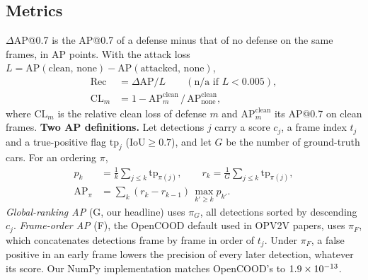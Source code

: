 \documentclass[conference]{IEEEtran}
\begin{document}
\subsection{Metrics}
$\Delta$AP@0.7 is the AP@0.7 of a defense minus that of no defense on the same frames, in AP points. With the
attack loss $L=\mathrm{AP}(\text{clean, none})-\mathrm{AP}(\text{attacked, none})$,
\begin{equation}
\begin{split}
\mathrm{Rec}&=\Delta\mathrm{AP}/L\qquad(\text{n/a if }L<0.005),\\
\mathrm{CL}_m&=1-\mathrm{AP}^{\mathrm{clean}}_{m}\,/\,\mathrm{AP}^{\mathrm{clean}}_{\mathrm{none}},
\end{split}
\label{eq:rec}
\end{equation}
where $\mathrm{CL}_m$ is the relative clean loss of defense $m$ and $\mathrm{AP}^{\mathrm{clean}}_{m}$ its AP@0.7
on clean frames.
\textbf{Two AP definitions.} Let detections $j$ carry a score $c_j$, a frame index $t_j$ and a true-positive
flag $\mathrm{tp}_j$ (IoU${}\ge 0.7$), and let $G$ be the number of ground-truth cars. For an ordering $\pi$,
\begin{equation}
\begin{split}
p_k&=\tfrac{1}{k}\textstyle\sum_{j\le k}\mathrm{tp}_{\pi(j)},\qquad
r_k=\tfrac{1}{G}\textstyle\sum_{j\le k}\mathrm{tp}_{\pi(j)},\\
\mathrm{AP}_\pi&=\textstyle\sum_k (r_k-r_{k-1})\,\max_{k'\ge k}p_{k'}.
\end{split}
\label{eq:ap}
\end{equation}
\emph{Global-ranking AP} (G, our headline) uses $\pi_G$, all detections sorted by descending $c_j$.
\emph{Frame-order AP} (F), the OpenCOOD default used in OPV2V papers, uses $\pi_F$, which concatenates detections
frame by frame in order of $t_j$. Under $\pi_F$, a false positive in an early frame lowers the precision of every
later detection, whatever its score. Our NumPy implementation matches OpenCOOD's to $1.9\times 10^{-13}$.
\end{document}
